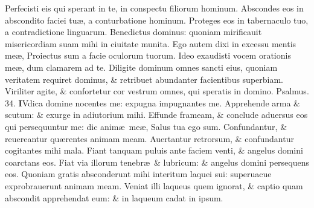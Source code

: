 \documentclass[a5paper,10pt]{book}
\def\ae{æ}
\begin{document}
\begin{multicols*}{2}
\newline \color{red} P\color{black}erfecisti eis qui sperant in te, in conspectu filiorum hominum.
\newline \color{red} A\color{black}bscondes eos in abscondito faciei tu\ae , a conturbatione hominum.
\newline \color{red} P\color{black}roteges eos in tabernaculo tuo, a contradictione linguarum.
\newline \color{red} B\color{black}enedictus dominus: quoniam mirificauit misericordiam suam mihi in ciuitate munita.
\newline \color{red} E\color{black}go autem dixi in excessu mentis me\ae , Proiectus sum a facie oculorum tuorum.
\newline \color{red} I\color{black}deo exaudisti vocem orationis me\ae , dum clamarem ad te.
\newline \color{red} D\color{black}iligite dominum omnes sancti eius, quoniam veritatem requiret dominus, \& retribuet abundanter facientibus superbiam.
\newline \color{red} V\color{black}iriliter agite, \& confortetur cor vestrum omnes, qui speratis in domino.
\newline \color{red} Psalmus. \hypertarget{ps34}{34.} \color{black}
\vspace{-.5em}
\lettrine[lines=2]{\bfseries \color{red} I}{}Vdica domine nocentes me: expugna impugnantes me.
\newline \color{red} A\color{black}pprehende arma \& scutum: \& exurge in adiutorium mihi.
\newline \color{red} E\color{black}ffunde frameam, \& conclude aduersus eos qui persequuntur me: dic anim\ae \ me\ae , Salus tua ego sum.
\newline \color{red} C\color{black}onfundantur, \& reuereantur qu\ae rentes animam meam.
\newline \color{red} A\color{black}uertantur retrorsum, \& confundantur cogitantes mihi mala.
\newline \color{red} F\color{black}iant tanquam puluis ante faciem venti, \& angelus domini coarctans eos.
\newline \color{red} F\color{black}iat via illorum tenebr\ae \ \& lubricum: \& angelus domini persequens eos.
\newline \color{red} Q\color{black}uoniam gratis absconderunt mihi interitum laquei sui: superuacue exprobrauerunt animam meam.
\newline \color{red} V\color{black}eniat illi laqueus quem ignorat, \& captio quam abscondit apprehendat eum: \& in laqueum cadat in ipsum.

\end{multicols*}
\end{document}
